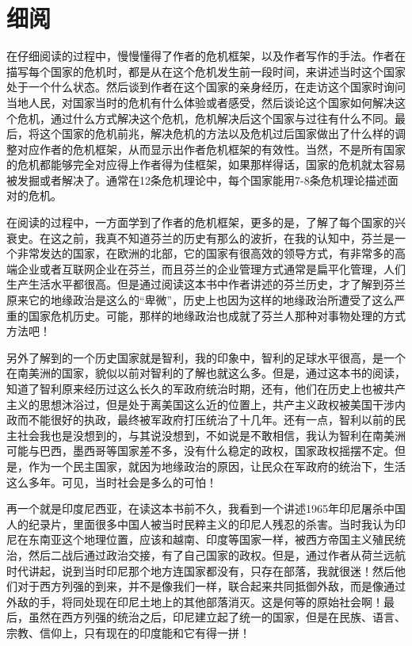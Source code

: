 \documentclass{article}
\begin{document}
    \section{细阅}
    在仔细阅读的过程中，慢慢懂得了作者的危机框架，以及作者写作的手法。作者在描写每个国家的危机时，都是从在这个危机发生前一段时间，来讲述当时这个国家处于一个什么状态。然后谈到作者在这个国家的亲身经历，在走访这个国家时询问当地人民，对国家当时的危机有什么体验或者感受，然后谈论这个国家如何解决这个危机，通过什么方式解决这个危机，危机解决后这个国家与过往有什么不同。最后，将这个国家的危机前兆，解决危机的方法以及危机过后国家做出了什么样的调整对应作者的危机框架，从而显示出作者危机框架的有效性。当然，不是所有国家的危机都能够完全对应得上作者得为佳框架，如果那样得话，国家的危机就太容易被发掘或者解决了。通常在12条危机理论中，每个国家能用7-8条危机理论描述面对的危机。

    在阅读的过程中，一方面学到了作者的危机框架，更多的是，了解了每个国家的兴衰史。在这之前，我真不知道芬兰的历史有那么的波折，在我的认知中，芬兰是一个非常发达的国家，在欧洲的北部，它的国家有很高效的领导方式，有非常多的高端企业或者互联网企业在芬兰，而且芬兰的企业管理方式通常是扁平化管理，人们生产生活水平都很高。但是通过阅读这本书中作者讲述的芬兰历史，才了解到芬兰原来它的地缘政治是这么的“卑微”，历史上也因为这样的地缘政治所遭受了这么严重的国家危机历史。可能，那样的地缘政治也成就了芬兰人那种对事物处理的方式方法吧！

    另外了解到的一个历史国家就是智利，我的印象中，智利的足球水平很高，是一个在南美洲的国家，貌似以前对智利的了解也就这么多。但是，通过这本书的阅读，知道了智利原来经历过这么长久的军政府统治时期，还有，他们在历史上也被共产主义的思想沐浴过，但是处于离美国这么近的位置上，共产主义政权被美国干涉内政而不能很好的执政，最终被军政府打压统治了十几年。还有一点，智利以前的民主社会我也是没想到的，与其说没想到，不如说是不敢相信，我认为智利在南美洲可能与巴西，墨西哥等国家差不多，没有什么稳定的政权，国家政权摇摆不定。但是，作为一个民主国家，就因为地缘政治的原因，让民众在军政府的统治下，生活这么多年。可见，当时社会是多么的可怕！

    再一个就是印度尼西亚，在读这本书前不久，我看到一个讲述1965年印尼屠杀中国人的纪录片，里面很多中国人被当时民粹主义的印尼人残忍的杀害。当时我认为印尼在东南亚这个地理位置，应该和越南、印度等国家一样，被西方帝国主义殖民统治，然后二战后通过政治交接，有了自己国家的政权。但是，通过作者从荷兰远航时代讲起，说到当时印尼那个地方连国家都没有，只存在部落，我就很迷！然后他们对于西方列强的到来，并不是像我们一样，联合起来共同抵御外敌，而是像通过外敌的手，将同处现在印尼土地上的其他部落消灭。这是何等的原始社会啊！最后，虽然在西方列强的统治之后，印尼建立起了统一的国家，但是在民族、语言、宗教、信仰上，只有现在的印度能和它有得一拼！
\end{document}
